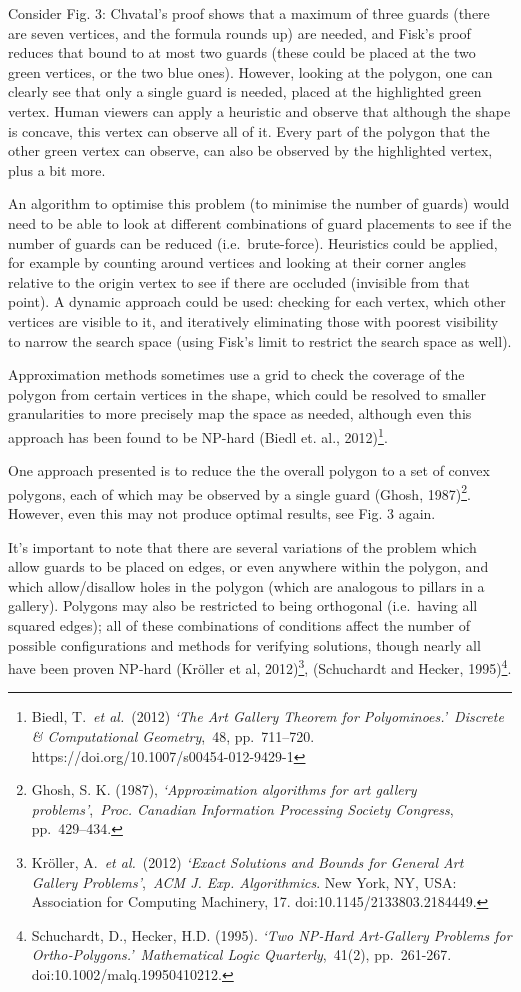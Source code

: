\documentclass[
]{article}
\begin{document}
Consider Fig. 3: Chvatal's proof shows that a maximum of three guards
(there are seven vertices, and the formula rounds up) are needed, and
Fisk's proof reduces that bound to at most two guards (these could be
placed at the two green vertices, or the two blue ones). However,
looking at the polygon, one can clearly see that only a single guard is
needed, placed at the highlighted green vertex. Human viewers can apply
a heuristic and observe that although the shape is concave, this vertex
can observe all of it. Every part of the polygon that the other green
vertex can observe, can also be observed by the highlighted vertex, plus
a bit more.

An algorithm to optimise this problem (to minimise the number of guards)
would need to be able to look at different combinations of guard
placements to see if the number of guards can be reduced
(i.e.~brute-force). Heuristics could be applied, for example by counting
around vertices and looking at their corner angles relative to the
origin vertex to see if there are occluded (invisible from that point).
A dynamic approach could be used: checking for each vertex, which other
vertices are visible to it, and iteratively eliminating those with
poorest visibility to narrow the search space (using Fisk's limit to
restrict the search space as well).

Approximation methods sometimes use a grid to check the coverage of the
polygon from certain vertices in the shape, which could be resolved to
smaller granularities to more precisely map the space as needed,
although even this approach has been found to be NP-hard (Biedl et. al.,
2012)\footnote{Biedl, T.~\emph{et al.}~(2012) \emph{`The Art Gallery
  Theorem for Polyominoes.'}~\emph{Discrete \& Computational
  Geometry},~48, pp.~711--720. https://doi.org/10.1007/s00454-012-9429-1}.

One approach presented is to reduce the the overall polygon to a set of
convex polygons, each of which may be observed by a single guard (Ghosh,
1987)\footnote{Ghosh, S. K. (1987), \emph{`Approximation algorithms for
  art gallery problems'},~\emph{Proc. Canadian Information Processing
  Society Congress}, pp.~429--434.}. However, even this may not produce
optimal results, see Fig. 3 again.

It's important to note that there are several variations of the problem
which allow guards to be placed on edges, or even anywhere within the
polygon, and which allow/disallow holes in the polygon (which are
analogous to pillars in a gallery). Polygons may also be restricted to
being orthogonal (i.e.~having all squared edges); all of these
combinations of conditions affect the number of possible configurations
and methods for verifying solutions, though nearly all have been proven
NP-hard (Kröller et al, 2012)\footnote{Kröller, A.~\emph{et al.}~(2012)
  \emph{`Exact Solutions and Bounds for General Art Gallery
  Problems'},~\emph{ACM J. Exp. Algorithmics}. New York, NY, USA:
  Association for Computing Machinery, 17. doi:10.1145/2133803.2184449.},
(Schuchardt and Hecker, 1995)\footnote{Schuchardt, D., Hecker, H.D.
  (1995). \emph{`Two NP‐Hard Art‐Gallery Problems for
  Ortho‐Polygons.'}~\emph{Mathematical Logic Quarterly},~41(2),
  pp.~261-267. doi:10.1002/malq.19950410212.}.
\end{document}
